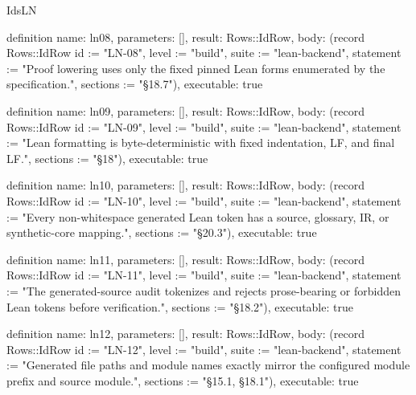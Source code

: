 \begin{lexlean}{IdsLN}
\begin{semanticmodule}
definition{
  name: ln08,
  parameters: [],
  result: Rows::IdRow,
  body: (record Rows::IdRow {id := "LN-08", level := "build", suite := "lean-backend", statement := "Proof lowering uses only the fixed pinned Lean forms enumerated by the specification.", sections := "§18.7"}),
  executable: true
}

definition{
  name: ln09,
  parameters: [],
  result: Rows::IdRow,
  body: (record Rows::IdRow {id := "LN-09", level := "build", suite := "lean-backend", statement := "Lean formatting is byte-deterministic with fixed indentation, LF, and final LF.", sections := "§18"}),
  executable: true
}

definition{
  name: ln10,
  parameters: [],
  result: Rows::IdRow,
  body: (record Rows::IdRow {id := "LN-10", level := "build", suite := "lean-backend", statement := "Every non-whitespace generated Lean token has a source, glossary, IR, or synthetic-core mapping.", sections := "§20.3"}),
  executable: true
}

definition{
  name: ln11,
  parameters: [],
  result: Rows::IdRow,
  body: (record Rows::IdRow {id := "LN-11", level := "build", suite := "lean-backend", statement := "The generated-source audit tokenizes and rejects prose-bearing or forbidden Lean tokens before verification.", sections := "§18.2"}),
  executable: true
}

definition{
  name: ln12,
  parameters: [],
  result: Rows::IdRow,
  body: (record Rows::IdRow {id := "LN-12", level := "build", suite := "lean-backend", statement := "Generated file paths and module names exactly mirror the configured module prefix and source module.", sections := "§15.1, §18.1"}),
  executable: true
}
\end{semanticmodule}
\end{lexlean}
